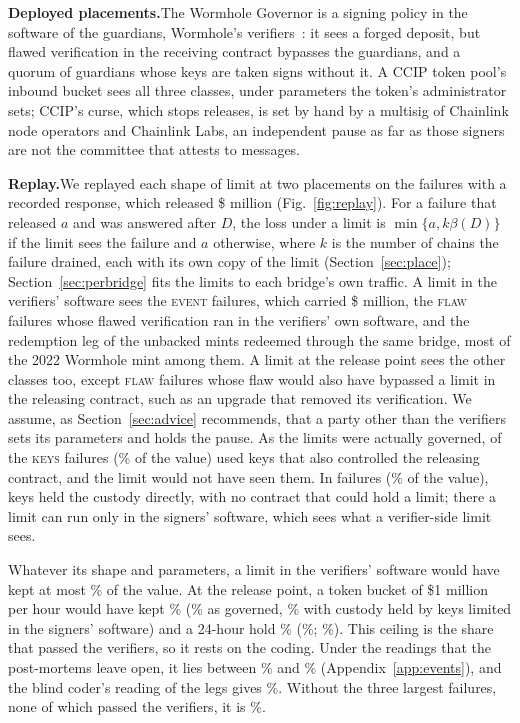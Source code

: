 \documentclass[conference,compsoc]{IEEEtran}
\numberwithin{equation}{section}
\theoremstyle{plain}
\theoremstyle{definition}
\theoremstyle{remark}
\newcommand{\runin}[1]{\par\smallskip\noindent\textbf{#1.}\enspace}
\newcommand{\cev}{\textsc{event}}
\newcommand{\ckeys}{\textsc{keys}}
\newcommand{\ccheck}{\textsc{flaw}}
\begin{document}
\runin{Deployed placements}The Wormhole Governor is a signing policy in the software of the guardians, Wormhole's verifiers~\cite{wormhole_governor}: it sees a forged deposit, but flawed verification in the receiving contract bypasses the guardians, and a quorum of guardians whose keys are taken signs without it. A CCIP token pool's inbound bucket sees all three classes, under parameters the token's administrator sets; CCIP's curse, which stops releases, is set by hand by a multisig of Chainlink node operators and Chainlink Labs, an independent pause as far as those signers are not the committee that attests to messages.
\runin{Replay}We replayed each shape of limit at two placements on the \nTimedEvents{} failures with a recorded response, which released \$ million (Fig.~\ref{fig:replay}). For a failure that released $a$ and was answered after $D$, the loss under a limit is $\min\{a, k\beta(D)\}$ if the limit sees the failure and $a$ otherwise, where $k$ is the number of chains the failure drained, each with its own copy of the limit (Section~\ref{sec:place}); Section~\ref{sec:perbridge} fits the limits to each bridge's own traffic. A limit in the verifiers' software sees the \cev{} failures, which carried \$ million, the \nVerifierChecksWords{} \ccheck{} failures whose flawed verification ran in the verifiers' own software, and the redemption leg of the \nRedeemedLegs{} unbacked mints redeemed through the same bridge, most of the 2022 Wormhole mint among them. A limit at the release point sees the other classes too, except \dFlawReachN{} \ccheck{} failures whose flaw would also have bypassed a limit in the releasing contract, such as an upgrade that removed its verification. We assume, as Section~\ref{sec:advice} recommends, that a party other than the verifiers sets its parameters and holds the pause. As the limits were actually governed, \vKeysCtrlN{} of the \vN{} \ckeys{} failures (\vKeysCtrlValuePct\% of the value) used keys that also controlled the releasing contract, and the limit would not have seen them. In \keysHeldN{} failures (\keysHeldPct\% of the value), keys held the custody directly, with no contract that could hold a limit; there a limit can run only in the signers' software, which sees what a verifier-side limit sees.

Whatever its shape and parameters, a limit in the verifiers' software would have kept at most \verifierMaxPct\% of the value. At the release point, a token bucket of \$1 million per hour would have kept \plRampSepPct\% (\plRampGovPct\% as governed, \plRampContractPct\% with custody held by keys limited in the signers' software) and a 24-hour hold \plHoldSepPct\% (\plHoldGovPct\%; \plHoldContractPct\%). This ceiling is the share that passed the verifiers, so it rests on the coding. Under the readings that the post-mortems leave open, it lies between \ceilLowPct\% and \ceilHighPct\% (Appendix~\ref{app:events}), and the blind coder's reading of the legs gives \blindVerifierPct\%. Without the three largest failures, none of which passed the verifiers, it is \verifierCeilNoTopThreePct\%.
\end{document}
